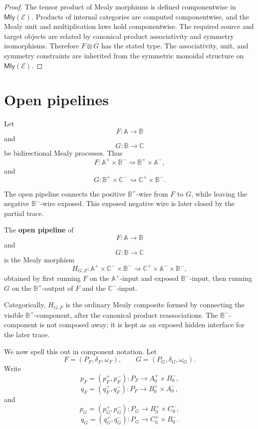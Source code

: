 \begin{proof}
The tensor product of Mealy morphisms is defined componentwise in
\(\mathsf{Mly}(\mathcal E)\).  Products of internal categories are computed
componentwise, and the Mealy unit and multiplication laws hold componentwise.
The required source and target objects are related by canonical product
associativity and symmetry isomorphisms.  Therefore \(F\otimes G\) has the
stated type.  The associativity, unit, and symmetry constraints are inherited
from the symmetric monoidal structure on \(\mathsf{Mly}(\mathcal E)\).
\end{proof}

\section{Open pipelines}
\label{sec:open-pipelines}

Let
\[
F:\mathbb A\to\mathbb B
\]
and
\[
G:\mathbb B\to\mathbb C
\]
be bidirectional Mealy processes.  Thus
\[
F:
\mathbb A^+\times\mathbb B^-
\rightsquigarrow
\mathbb B^+\times\mathbb A^-,
\]
and
\[
G:
\mathbb B^+\times\mathbb C^-
\rightsquigarrow
\mathbb C^+\times\mathbb B^-.
\]

The open pipeline connects the positive \(\mathbb B^+\)-wire from \(F\) to
\(G\), while leaving the negative \(\mathbb B^-\)-wire exposed.  This exposed
negative wire is later closed by the partial trace.

\begin{definition}
\label{def:open-pipeline}
The \textbf{open pipeline} of
\[
F:\mathbb A\to\mathbb B
\]
and
\[
G:\mathbb B\to\mathbb C
\]
is the Mealy morphism
\[
H_{G,F}:
\mathbb A^+\times\mathbb C^-\times\mathbb B^-
\rightsquigarrow
\mathbb C^+\times\mathbb A^-\times\mathbb B^-,
\]
obtained by first running \(F\) on the \(\mathbb A^+\)-input and exposed
\(\mathbb B^-\)-input, then running \(G\) on the \(\mathbb B^+\)-output of
\(F\) and the \(\mathbb C^-\)-input.
\end{definition}

Categorically, \(H_{G,F}\) is the ordinary Mealy composite formed by connecting
the visible \(\mathbb B^+\)-component, after the canonical product
reassociations.  The \(\mathbb B^-\)-component is not composed away; it is
kept as an exposed hidden interface for the later trace.

We now spell this out in component notation.  Let
\[
F=(P_F,\delta_F,\omega_F),
\qquad
G=(P_G,\delta_G,\omega_G).
\]
Write
\[
p_F=(p_F^+,p_F^-):P_F\to A_0^+\times B_0^-,
\]
\[
q_F=(q_F^+,q_F^-):P_F\to B_0^+\times A_0^-,
\]
and
\[
p_G=(p_G^+,p_G^-):P_G\to B_0^+\times C_0^-,
\]
\[
q_G=(q_G^+,q_G^-):P_G\to C_0^+\times B_0^-.
\]

